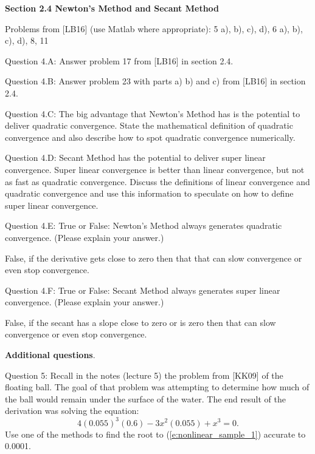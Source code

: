 \documentclass{article}
\renewcommand{\cite}[1]{[#1]}
\begin{document}
\par \bigskip \par
{\bf Section 2.4 Newton's Method and Secant Method} \\  \par \medskip \noindent

\par \noindent
Problems from \cite{LB16} (use Matlab where appropriate): 5 a), b), c), d), 6 a), b), c), d), 8, 11
\par \medskip \noindent
%
Question 4.A: Answer problem 17 from \cite{LB16} in section 2.4. 
\medskip \par \noindent
%
Question 4.B: Answer problem 23 with parts a) b) and c) from \cite{LB16} in section 2.4. 
  \medskip \par \noindent
%
Question 4.C: The big advantage that Newton's Method has is the potential to deliver quadratic convergence. State the mathematical definition of quadratic convergence and also describe how to spot quadratic convergence numerically. 
  
\medskip \par \noindent
%
Question 4.D: Secant Method has the potential to deliver super linear convergence. Super linear convergence is better than linear convergence, but not as fast as quadratic convergence. Discuss the definitions of linear convergence and quadratic convergence and use this information to speculate on how to define super linear convergence.   

\medskip \par \noindent
%
Question 4.E: True or False: Newton's Method always generates quadratic convergence. (Please explain your answer.)  

{\color{teal}False, if the derivative gets close to zero then that that can slow convergence or even stop convergence.}

\medskip \par \noindent
%
Question 4.F: True or False: Secant Method always generates super linear convergence. (Please explain your answer.)  

{\color{teal} False, if the secant has a slope close to zero or is zero then that can slow convergence or even stop convergence.}

\medskip \par \noindent
%
{\bf Additional questions}. \medskip \par \noindent
Question 5: Recall in the notes (lecture 5) the problem from \cite{KK09} of the floating ball. The goal of that problem was attempting to determine how much of the ball would remain under the surface of the water. The end result of the derivation was solving the equation:
\begin{equation}
4(0.055)^3(0.6)-3x^2(0.055)+x^3=0.    
    \label{e:nonlinear_sample_1}
\end{equation}
Use one of the methods to find the root to (\ref{e:nonlinear_sample_1}) accurate to 0.0001. 
\end{document}
